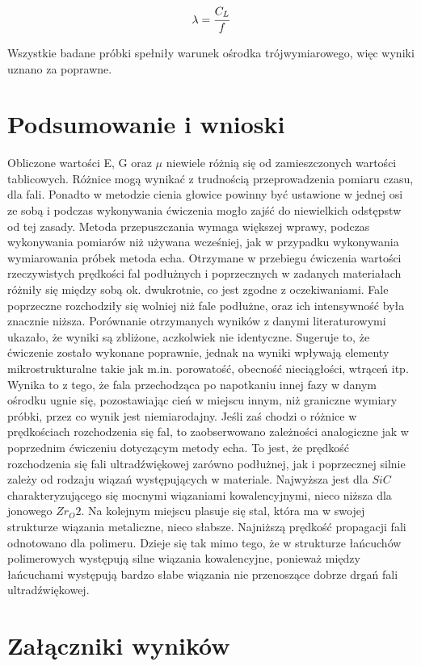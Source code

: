 \documentclass[a4paper,12pt]{article}
\begin{document}
$$\lambda=\cfrac{C_L}{f}$$



Wszystkie badane próbki spełniły warunek ośrodka trójwymiarowego, więc wyniki uznano za poprawne.
\newpage

\section{Podsumowanie i wnioski}
Obliczone wartości E, G oraz $\mu$ niewiele różnią się od zamieszczonych wartości tablicowych. Różnice mogą wynikać z trudnością przeprowadzenia  pomiaru czasu, dla fali. Ponadto w metodzie cienia głowice powinny być ustawione w jednej osi ze sobą i podczas wykonywania ćwiczenia mogło zajść do niewielkich odstępstw od tej zasady. Metoda przepuszczania wymaga większej wprawy, podczas wykonywania pomiarów niż używana wcześniej, jak w przypadku wykonywania wymiarowania próbek metoda echa.
Otrzymane w przebiegu ćwiczenia wartości rzeczywistych prędkości fal podłużnych i poprzecznych w zadanych materiałach różniły się między sobą ok. dwukrotnie, co jest zgodne z oczekiwaniami. Fale poprzeczne rozchodziły się wolniej niż fale podłużne, oraz ich intensywność była znacznie niższa. 
Porównanie otrzymanych wyników z danymi literaturowymi ukazało, że wyniki są zbliżone, aczkolwiek nie identyczne. Sugeruje to, że ćwiczenie zostało wykonane poprawnie, jednak na wyniki wpływają elementy mikrostrukturalne takie jak m.in. porowatość, obecność nieciągłości, wtrąceń itp. Wynika to z tego, że fala przechodząca po napotkaniu innej fazy w danym ośrodku ugnie się, pozostawiając cień w miejscu innym, niż graniczne wymiary próbki, przez co wynik jest niemiarodajny. 
Jeśli zaś chodzi o różnice w prędkościach rozchodzenia się fal, to zaobserwowano zależności analogiczne jak w poprzednim ćwiczeniu dotyczącym metody echa. To jest, że prędkość rozchodzenia się fali ultradźwiękowej zarówno podłużnej, jak i poprzecznej silnie zależy od rodzaju wiązań występujących w materiale. Najwyższa jest dla $SiC$ charakteryzującego się mocnymi wiązaniami kowalencyjnymi, nieco niższa dla jonowego  $Zr_O2$. Na kolejnym miejscu plasuje się stal, która ma w swojej strukturze wiązania metaliczne, nieco słabsze. Najniższą prędkość propagacji fali odnotowano dla polimeru. Dzieje się tak mimo tego, że w strukturze łańcuchów polimerowych występują silne wiązania kowalencyjne, ponieważ między łańcuchami występują bardzo słabe wiązania nie przenoszące dobrze drgań fali ultradźwiękowej.

\section{Załączniki wyników}
\end{document}
